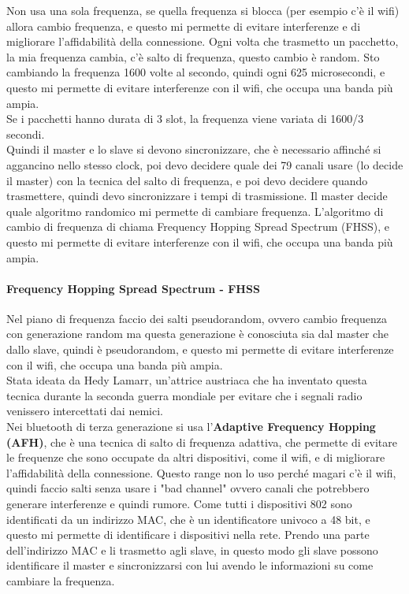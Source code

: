 Non usa una sola frequenza, se quella frequenza si blocca (per esempio c'è il wifi) allora cambio frequenza, e questo mi permette di evitare interferenze e di migliorare l'affidabilità della connessione. Ogni volta che trasmetto un pacchetto, la mia frequenza cambia, c'è salto di frequenza, questo cambio è random. Sto cambiando la frequenza 1600 volte al secondo, quindi ogni 625 microsecondi, e questo mi permette di evitare interferenze con il wifi, che occupa una banda più ampia.\\
Se i pacchetti hanno durata di 3 slot, la frequenza viene variata di 1600/3 secondi.\\

Quindi il master e lo slave si devono sincronizzare, che è necessario affinché si aggancino nello stesso clock, poi devo decidere quale dei 79 canali usare (lo decide il master) con la tecnica del salto di frequenza, e poi devo decidere quando trasmettere, quindi devo sincronizzare i tempi di trasmissione. Il master decide quale algoritmo randomico mi permette di cambiare frequenza. L'algoritmo di cambio di frequenza di chiama Frequency Hopping Spread Spectrum (FHSS), e questo mi permette di evitare interferenze con il wifi, che occupa una banda più ampia.\\

\paragraph{Frequency Hopping Spread Spectrum - FHSS}
Nel piano di frequenza faccio dei salti pseudorandom, ovvero cambio frequenza con generazione random ma questa generazione è conosciuta sia dal master che dallo slave, quindi è pseudorandom, e questo mi permette di evitare interferenze con il wifi, che occupa una banda più ampia.\\

Stata ideata da Hedy Lamarr, un'attrice austriaca che ha inventato questa tecnica durante la seconda guerra mondiale per evitare che i segnali radio venissero intercettati dai nemici.\\

Nei bluetooth di terza generazione si usa l'\textbf{Adaptive Frequency Hopping (AFH)}, che è una tecnica di salto di frequenza adattiva, che permette di evitare le frequenze che sono occupate da altri dispositivi, come il wifi, e di migliorare l'affidabilità della connessione. Questo range non lo uso perché magari c'è il wifi, quindi faccio salti senza usare i "bad channel" ovvero canali che potrebbero generare interferenze e quindi rumore. Come tutti i dispositivi 802 sono identificati da un indirizzo MAC, che è un identificatore univoco a 48 bit, e questo mi permette di identificare i dispositivi nella rete. Prendo una parte dell'indirizzo MAC e li trasmetto agli slave, in questo modo gli slave possono identificare il master e sincronizzarsi con lui avendo le informazioni su come cambiare la frequenza.\\

